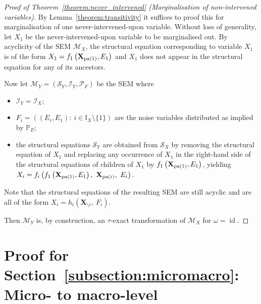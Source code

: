 \begin{proof}[Proof of Theorem~\ref{theorem:never_intervened} (Marginalisation of non-intervened variables)]
By Lemma~\ref{theorem:transitivity} it suffices to proof this for marginalisation of one never-intervened-upon variable.
Without loss of generality, let $X_1$ be the never-intervened-upon variable to be marginalised out.
By acyclicity of the SEM $\mathcal{M}_X$, the structural equation corresponding to variable $X_1$ is of the form $X_1 = f_1\left(\mathbf{X}_{\operatorname{pa}(1)},E_1\right)$ and $X_1$ does not appear in the structural equation for any of its ancestors.

Now let $\mathcal{M}_Y=(\mathcal{S}_Y,\mathcal{I}_Y,\mathcal{P}_F)$ be the SEM where
%
\begin{itemize}
    \item $\mathcal{I}_Y = \mathcal{I}_X$;
    \item $F_i = ((E_i,E_1):\ i \in \mathbb{I}_X\setminus\{1\})$ are the noise variables distributed as implied by $\mathbb{P}_E$;
    \item the structural equations $\mathcal{S}_Y$ are obtained from $\mathcal{S}_X$ by removing the structural equation of $X_1$ and replacing any occurrence of $X_1$ in the right-hand side of the structural equations of children of $X_1$ by $f_1\left(\mathbf{X}_{\operatorname{pa}(1)},E_1\right)$, yielding $X_i = f_i\left(f_1\left(\mathbf{X}_{\pa(1)},E_1\right),\ \mathbf{X}_{\pa(i)},\ E_i\right)$.
\end{itemize}
%
Note that the structural equations  of the resulting SEM are still acyclic and are all of the form $X_i = h_i\left(\mathbf{X}_{\setminus i},\ F_i\right)$.

Then $\mathcal{M}_Y$ is, by construction, an $\tau$-exact transformation of $\mathcal{M}_X$ for $\omega=\operatorname{id}$.
%
\end{proof}





\section{Proof for Section~\ref{subsection:micromacro}: Micro- to macro-level}\label{micromacro:appendix}

